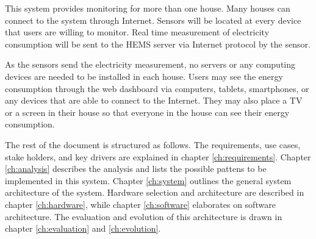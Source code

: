 This system provides monitoring for more than one house. Many houses can connect to the system through Internet. Sensors will be located at every device that users are willing to monitor. Real time measurement of electricity consumption will be sent to the HEMS server via Internet protocol by the sensor.


As the sensors send the electricity measurement, no servers or any computing devices are needed to be installed in each house. Users may see the energy consumption through the web dashboard via computers, tablets, smartphones, or any devices that are able to connect to the Internet. They may also place a TV or a screen in their house so that everyone in the house can see their energy consumption.

The rest of the document is structured as follows. The requirements, use cases, stake holders, and key drivers are explained in chapter \ref{ch:requirements}. Chapter \ref{ch:analysis} describes the analysis and lists the possible pattens to be implemented in this system. Chapter \ref{ch:system} outlines the general system architecture of the system. Hardware selection and architecture are described in chapter \ref{ch:hardware}, while chapter \ref{ch:software} elaborates on software architecture. The evaluation and evolution of this architecture is drawn in chapter \ref{ch:evaluation} and \ref{ch:evolution}. 
